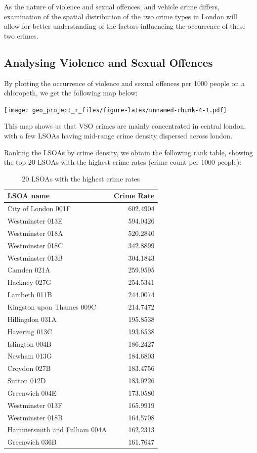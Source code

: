 \documentclass[]{article}
\begin{document}
As the nature of violence and sexual offences, and vehicle crime
differs, examination of the spatial distribution of the two crime types
in London will allow for better understanding of the factors influencing
the occurrence of these two crimes.

\subsection{Analysing Violence and Sexual
Offences}\label{analysing-violence-and-sexual-offences}

By plotting the occurrence of violence and sexual offences per 1000
people on a chloropeth, we get the following map below:

\texttt{[image: geo\_project\_r\_files/figure-latex/unnamed-chunk-4-1.pdf]}

This map shows us that VSO crimes are mainly concentrated in central
london, with a few LSOAs having mid-range crime density dispersed across
london.

Ranking the LSOAs by crime density, we obtain the following rank table,
showing the top 20 LSOAs with the highest crime rates (crime count per
1000 people):

\begin{table}

\caption{\label{tab:top20}20 LSOAs with the highest crime rates}
\centering
\begin{tabular}[t]{l|r}
\hline
LSOA name & Crime Rate\\
\hline
City of London 001F & 602.4904\\
\hline
Westminster 013E & 594.0426\\
\hline
Westminster 018A & 520.2840\\
\hline
Westminster 018C & 342.8899\\
\hline
Westminster 013B & 304.1843\\
\hline
Camden 021A & 259.9595\\
\hline
Hackney 027G & 254.5341\\
\hline
Lambeth 011B & 244.0074\\
\hline
Kingston upon Thames 009C & 214.7472\\
\hline
Hillingdon 031A & 195.8538\\
\hline
Havering 013C & 193.6538\\
\hline
Islington 004B & 186.2427\\
\hline
Newham 013G & 184.6803\\
\hline
Croydon 027B & 183.4756\\
\hline
Sutton 012D & 183.0226\\
\hline
Greenwich 004E & 173.0580\\
\hline
Westminster 013F & 165.9919\\
\hline
Westminster 018B & 164.5708\\
\hline
Hammersmith and Fulham 004A & 162.2313\\
\hline
Greenwich 036B & 161.7647\\
\hline
\end{tabular}
\end{table}
\end{document}
